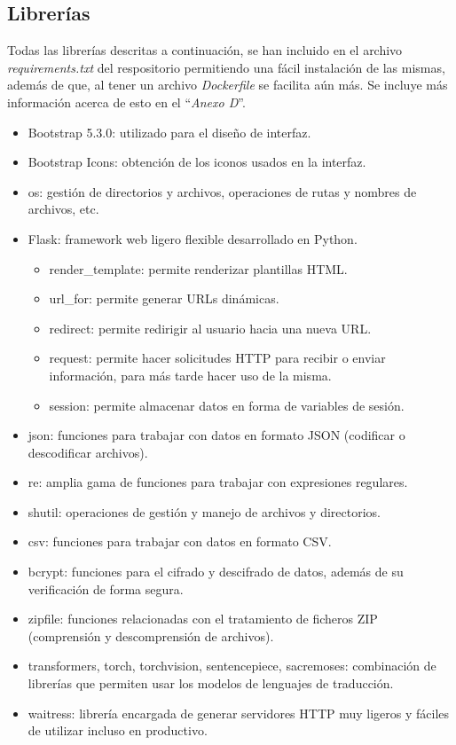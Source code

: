 \subsection{Librerías}
Todas las librerías descritas a continuación, se han incluido en el archivo \textit{requirements.txt} del respositorio permitiendo una fácil instalación de las mismas, además de que, al tener un archivo \textit{Dockerfile} se facilita aún más. Se incluye más información acerca de esto en el ``\textit{Anexo D}''.
\begin{itemize}
    \item Bootstrap 5.3.0: utilizado para el diseño de interfaz.
    \item Bootstrap Icons: obtención de los iconos usados en la interfaz.
    \item os: gestión de directorios y archivos, operaciones de rutas y nombres de archivos, etc.
    \item Flask: framework web ligero flexible desarrollado en Python.
    \begin{itemize}
        \item render\_template: permite renderizar plantillas HTML.
        \item url\_for: permite generar URLs dinámicas.
        \item redirect: permite redirigir al usuario hacia una nueva URL.
        \item request: permite hacer solicitudes HTTP para recibir o enviar información, para más tarde hacer uso de la misma.
        \item session: permite almacenar datos en forma de variables de sesión.
    \end{itemize}
    \item json: funciones para trabajar con datos en formato JSON (codificar o descodificar archivos).
    \item re: amplia gama de funciones para trabajar con expresiones regulares.
    \item shutil: operaciones de gestión y manejo de archivos y directorios.
    \item csv: funciones para trabajar con datos en formato CSV.
    \item bcrypt: funciones para el cifrado y descifrado de datos, además de su verificación de forma segura.
    \item zipfile: funciones relacionadas con el tratamiento de ficheros ZIP (comprensión y descomprensión de archivos).
    \item transformers, torch, torchvision, sentencepiece, sacremoses: combinación de librerías que permiten usar los modelos de lenguajes de traducción.
    \item waitress: librería encargada de generar servidores HTTP muy ligeros y fáciles de utilizar incluso en productivo.
\end{itemize}

